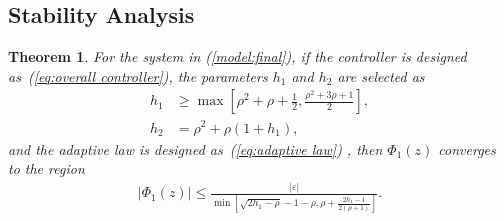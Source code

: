 \documentclass{ifacconf}
\newtheorem{mythm}{Theorem}
\begin{document}
\subsection{Stability Analysis} \label{subsec: Stability Analysis}
\begin{mythm} \label{thm: stability of s}
For the system in (\ref{model:final}), if the controller is designed as~(\ref{eq:overall controller}), the parameters $h_1$ and $h_2$ are selected as
\begin{align} \label{ineq:h_1}
h_1 &\geq \max \left[ \rho^2+\rho+\frac{1}{2}, \frac{\rho^2+3 \rho +1}{2}\right],\\ \label{eq:h_2}
h_2  &= \rho^2+\rho(1+h_1),
\end{align}
and the adaptive law is designed as~(\ref{eq:adaptive law})
, then $\Phi_1(z)$ converges to the region
\begin{align}
    |\Phi_1(z)| \leq \frac{|\varepsilon|}{\min \left[\sqrt{2h_1-\rho}-1-\rho, \rho+\frac{2h_1-1}{2(\rho+1)} \right]}.
\end{align}
\end{mythm}
\end{document}
